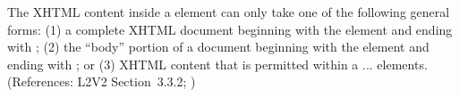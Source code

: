 The XHTML content inside a  element can only take one of the
following general forms: (1) a complete XHTML document beginning with the
element  and ending with ; (2) the ``body''
portion of a document beginning with the element  and ending
with ; or (3) XHTML content that is permitted within a
 ...  elements.  (References: L2V2
Section~3.3.2; )
